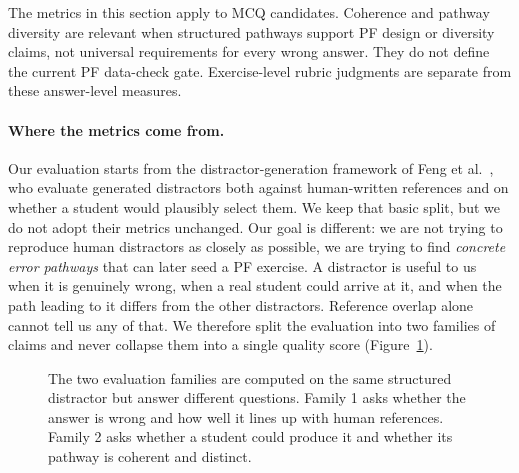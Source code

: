 The metrics in this section apply to MCQ candidates. Coherence and pathway diversity are relevant when structured pathways support PF design or diversity claims, not universal requirements for every wrong answer. They do not define the current PF data-check gate. Exercise-level rubric judgments are separate from these answer-level measures.

\paragraph{Where the metrics come from.} Our evaluation starts from the distractor-generation framework of Feng et al.~\cite{feng2024}, who evaluate generated distractors both against human-written references and on whether a student would plausibly select them. We keep that basic split, but we do not adopt their metrics unchanged. Our goal is different: we are not trying to reproduce human distractors as closely as possible, we are trying to find \emph{concrete error pathways} that can later seed a PF exercise. A distractor is useful to us when it is genuinely wrong, when a real student could arrive at it, and when the path leading to it differs from the other distractors. Reference overlap alone cannot tell us any of that. We therefore split the evaluation into two families of claims and never collapse them into a single quality score (Figure~\ref{fig:metric-pipeline}).

\begin{figure}[h]
\centering
{}
\caption{The two evaluation families are computed on the same structured distractor but answer different questions. Family 1 asks whether the answer is wrong and how well it lines up with human references. Family 2 asks whether a student could produce it and whether its pathway is coherent and distinct.}
\label{fig:metric-pipeline}
\end{figure}

